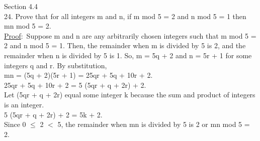 \documentclass{article}
\begin{document}
Section 4.4\\
24. Prove that for all integers m and n, if m mod 5 = 2 and n mod 5 = 1 then mn mod 5 = 2. \\
\underline{Proof}$\colon$ Suppose m and n are any arbitrarily chosen integers such that m mod 5 = 2 and n mod 5 = 1. Then, the remainder when m is divided by 5 is 2, and the remainder when n is divided by 5 is 1. So, m = 5q + 2 and n = 5r + 1 for some integers q and r. By substitution, \\
mn = (5q + 2)(5r + 1) = 25qr + 5q + 10r + 2. \\
25qr + 5q + 10r + 2 = 5 (5qr + q + 2r) + 2. \\
Let (5qr + q + 2r) equal some integer k because the sum and product of integers is an integer.\\
5 (5qr + q + 2r) + 2 = 5k + 2.\\
Since 0 $\leq$ 2 $<$ 5, the remainder when mn is divided by 5 is 2 or mn mod 5 = 2.\\
\end{document}
